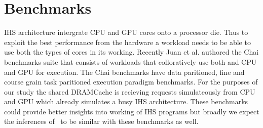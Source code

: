 \section{Benchmarks}
IHS architecture intergrate CPU and GPU cores onto a processor die. Thus to exploit the best performance from the hardware a workload needs to be able to use both the types of cores in its working. Recently Juan et al. authored the Chai benchmarks suite \cite{chai} that consists of workloads that colloratively use both and CPU and GPU for execution. The Chai benchmarks have data paritioned, fine and course grain task paritioned execution paradigm benchmarks. For the purposes of our study the shared DRAMCache is recieving requests simulateously from CPU and GPU which already simulates a busy IHS architecture. These benchmarks could provide better insights into working of IHS programs but broadly we expect the inferences of \cachename\ to be similar with these benchmarks as well.